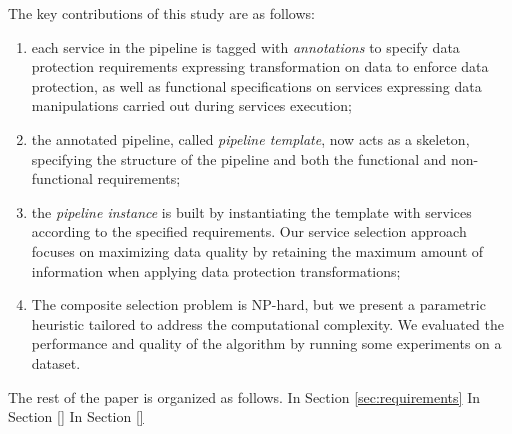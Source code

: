 The key contributions of this study are as follows:
\begin{enumerate}
\item each service in the pipeline is tagged with \textit{annotations} to specify data protection requirements expressing transformation on data to enforce data protection, as well as functional specifications on services expressing data manipulations carried out during services execution;
\item the annotated pipeline, called \textit{pipeline template}, now acts as a skeleton, specifying the structure of the pipeline and both the functional and non-functional requirements;
\item the \textit{pipeline instance} is built by instantiating the template with services according to the specified requirements. Our service selection approach focuses on maximizing data quality by retaining the maximum amount of information when applying data protection transformations;
\item The composite selection problem is NP-hard, but we present a parametric heuristic tailored to address the computational
complexity. We evaluated the performance and quality of the algorithm by running some experiments on a dataset. 
\end{enumerate}

The rest of the paper is organized as follows. In Section \ref{sec:requirements} In Section \ref{} In Section \ref{}
